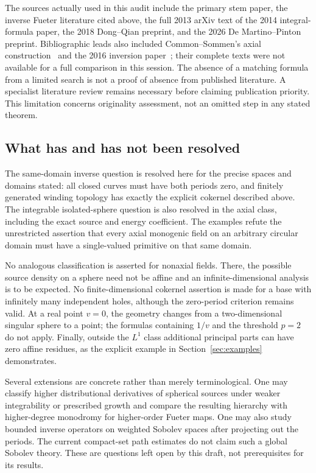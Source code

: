 \documentclass[11pt,a4paper]{article}
\numberwithin{equation}{section}
\theoremstyle{definition}
\theoremstyle{remark}
\begin{document}
The sources actually used in this audit include the primary stem paper,
the inverse Fueter literature cited above, the full 2013 arXiv text of
the 2014 integral-formula paper, the 2018 Dong--Qian preprint, and the
2026 De Martino--Pinton preprint. Bibliographic leads also included
Common--Sommen's axial construction~\cite{Common} and the 2016 inversion
paper~\cite{DKQS}; their complete texts were not available for a full
comparison in this session. The absence of a matching formula from a
limited search is not a proof of absence from published literature.
A specialist literature review remains necessary before claiming
publication priority. This limitation concerns originality assessment,
not an omitted step in any stated theorem.

\subsection{What has and has not been resolved}
The same-domain inverse question is resolved here for the precise
spaces and domains stated: all closed curves must have both periods
zero, and finitely generated winding topology has exactly the explicit
cokernel described above. The integrable isolated-sphere question is
also resolved in the axial class, including the exact source and
energy coefficient. The examples refute the unrestricted assertion
that every axial monogenic field on an arbitrary circular domain must
have a single-valued primitive on that same domain.

No analogous classification is asserted for nonaxial fields. There,
the possible source density on a sphere need not be affine and an
infinite-dimensional analysis is to be expected. No finite-dimensional
cokernel assertion is made for a base with infinitely many independent
holes, although the zero-period criterion remains valid. At a real
point $v=0$, the geometry changes from a two-dimensional singular
sphere to a point; the formulas containing $1/v$ and the threshold
$p=2$ do not apply. Finally, outside the $L^1$ class additional
principal parts can have zero affine residues, as the explicit example
in Section~\ref{sec:examples} demonstrates.

Several extensions are concrete rather than merely terminological.
One may classify higher distributional derivatives of spherical
sources under weaker integrability or prescribed growth and compare
the resulting hierarchy with higher-degree monodromy for higher-order
Fueter maps. One may also study bounded inverse operators on weighted
Sobolev spaces after projecting out the periods. The current compact-set
path estimates do not claim such a global Sobolev theory. These are
questions left open by this draft, not prerequisites for its results.
\end{document}
